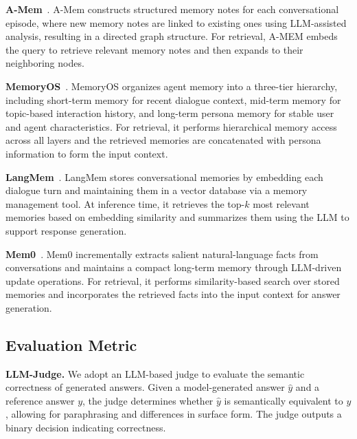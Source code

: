 \textbf{A-Mem}~\cite{DBLP:journals/corr/abs-2502-12110}.
A-Mem constructs structured memory notes for each conversational episode, where new memory notes are linked to existing ones using LLM-assisted analysis, resulting in a directed graph structure.
For retrieval, A-MEM embeds the query to retrieve relevant memory notes and then expands to their neighboring nodes.


\textbf{MemoryOS}~\cite{DBLP:journals/corr/abs-2506-06326}.
MemoryOS organizes agent memory into a three-tier hierarchy, including short-term memory for recent dialogue context, mid-term memory for topic-based interaction history, and long-term persona memory for stable user and agent characteristics.
For retrieval, it performs hierarchical memory access across all layers and the retrieved memories are concatenated with persona information to form the input context.

\textbf{LangMem}~\cite{langmem2025}.
LangMem stores conversational memories by embedding each dialogue turn and maintaining them in a vector database via a memory management tool.
At inference time, it retrieves the top-$k$ most relevant memories based on embedding similarity and summarizes them using the LLM to support response generation.

\textbf{Mem0}~\cite{DBLP:journals/corr/abs-2504-19413}.
Mem0 incrementally extracts salient natural-language facts from conversations and maintains a compact long-term memory through LLM-driven update operations.
For retrieval, it performs similarity-based search over stored memories and incorporates the retrieved facts into the input context for answer generation.

\subsection{Evaluation Metric}

\textbf{LLM-Judge.}
We adopt an LLM-based judge to evaluate the semantic correctness of generated answers.
Given a model-generated answer $\hat{y}$ and a reference answer $y$, the judge determines whether $\hat{y}$ is semantically equivalent to $y$, allowing for paraphrasing and differences in surface form.
The judge outputs a binary decision indicating correctness.

